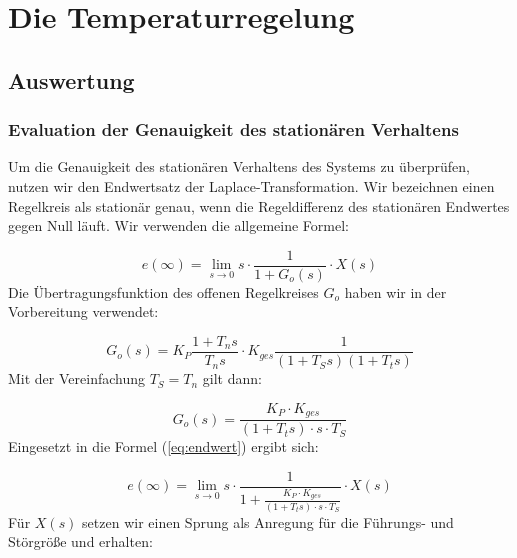 \documentclass{report}
\begin{document}
\newpage


\tableofcontents

\listoffigures

\newpage

\chapter{Die Temperaturregelung}


\section{Auswertung}


\subsection{Evaluation der Genauigkeit des stationären Verhaltens}

Um die Genauigkeit des stationären Verhaltens des Systems zu überprüfen, nutzen wir den Endwertsatz der Laplace-Transformation. Wir bezeichnen einen Regelkreis als stationär genau, wenn die Regeldifferenz des stationären Endwertes gegen Null läuft.
\noindent
Wir verwenden die allgemeine Formel:

\begin{equation}
  \label{eq:endwert}
  e(\infty) = \lim_{s\to 0} s \cdot \frac{1}{1+G_{o}(s)}\cdot X(s)
\end{equation}
\noindent
Die Übertragungsfunktion des offenen Regelkreises $G_{o}$ haben wir in der Vorbereitung verwendet:

\begin{equation}
  \label{eq:1}
  G_{o}(s) = K_P\frac{1+T_ns}{T_ns}\cdot K_{ges}\frac{1}{(1+T_Ss)(1+T_ts)}
\end{equation}
\noindent
Mit der Vereinfachung $T_{S} = T_{n}$ gilt dann:

\begin{equation}
  \label{eq:3}
  G_{o}(s) = \frac{K_{P}\cdot K_{ges}}{(1+T_{t}s)\cdot s \cdot T_{S}}
\end{equation}
Eingesetzt in die Formel (\ref{eq:endwert}) ergibt sich:

\begin{equation}
  \label{eq:2}
  e(\infty) = \lim_{s\to 0} s \cdot \frac{1}{1+\frac{K_{P}\cdot K_{ges}}{(1+T_{t}s)\cdot s \cdot T_{S}}} \cdot X(s)
\end{equation}
Für $X(s)$ setzen wir einen Sprung als Anregung für die Führungs- und Störgröße und erhalten:
\end{document}
